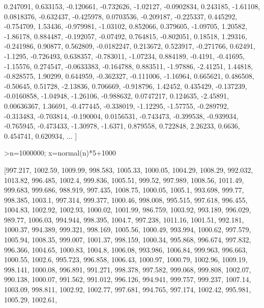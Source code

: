 \documentclass[a4paper,10pt]{article}
\begin{document}
\begin{eulernotebook}
\begin{eulercomment}
\begin{eulercomment}
\begin{euleroutput}
  0.247091,  0.633153,  -0.120661,  -0.732626,  -1.02127,  -0.0902834,
  0.243185,  -1.61108,  0.0818376,  -0.632437,  -0.425978,  0.0703536,
  -0.209187,  -0.225337,  0.445292,  -0.754709,  1.53436,  -0.979981,
  -1.03102,  0.852066,  0.379605,  -1.09705,  1.20582,  -1.86178,
  0.884487,  -0.192057,  -0.07492,  0.764815,  -0.802051,  0.18518,
  1.29316,  -0.241986,  0.90877,  0.562809,  -0.0182247,  0.213672,
  0.523917,  -0.271766,  0.62491,  -1.1295,  -0.726493,  0.638357,
  -0.783011,  -1.07234,  0.884189,  -0.4191,  -0.41695,  -1.15576,
  0.274547,  -0.0633383,  -0.164788,  0.883511,  -1.97886,  -2.41251,
  1.44818,  -0.828575,  1.90299,  0.644959,  -0.362327,  -0.111006,
  -1.16964,  0.665621,  0.486508,  -0.50645,  0.51728,  -2.13836,
  0.706669,  -0.918796,  1.42452,  0.435429,  -0.137239,  -0.0160858,
  -1.04948,  -1.26106,  -0.988632,  0.0747217,  0.124635,  -2.45891,
  0.00636367,  1.36691,  -0.477445,  -0.338019,  -1.12295,  -1.57755,
  -0.289792,  -0.313483,  -0.703814,  -0.190004,  0.0156531,  -0.743473,
  -0.399538,  -0.939934,  -0.765945,  -0.473433,  -1.30978,  -1.6371,
  0.879558,  0.722848,  2.26233,  0.6636,  0.454741,  0.620934,
   ... ]
\end{euleroutput}
\begin{eulerprompt}
>n=1000000; x=normal(n)*5+1000
\end{eulerprompt}
\begin{euleroutput}
  [997.217,  1002.59,  1009.99,  998.583,  1005.33,  1000.05,  1004.29,
  1008.29,  992.032,  1013.82,  996.485,  1002.4,  999.836,  1005.51,
  999.52,  997.989,  1008.56,  1011.49,  999.683,  999.686,  988.919,
  997.435,  1008.75,  1000.05,  1005.1,  993.698,  999.77,  998.385,
  1003.1,  997.314,  999.377,  1000.46,  998.008,  995.515,  997.618,
  996.455,  1004.83,  1002.92,  1002.93,  1000.02,  1001.99,  986.759,
  1003.92,  993.189,  996.029,  989.77,  1006.03,  994.944,  998.395,
  1004.7,  997.238,  1011.16,  1001.51,  992.181,  1000.37,  994.389,
  999.321,  998.169,  1005.56,  1000.49,  993.994,  1000.62,  997.579,
  1005.94,  1008.35,  999.007,  1001.37,  998.159,  1000.34,  995.868,
  996.674,  997.832,  996.366,  1004.65,  1000.83,  1004.8,  1006.08,
  993.986,  1006.84,  999.963,  996.663,  1000.55,  1002.6,  995.723,
  996.858,  1006.43,  1000.97,  1000.79,  1002.96,  1009.19,  998.141,
  1000.08,  996.891,  991.271,  998.378,  997.582,  999.068,  999.808,
  1002.07,  990.138,  1000.07,  991.562,  991.012,  996.126,  994.941,
  999.757,  999.237,  1007.14,  1003.09,  998.811,  1002.92,  1002.77,
  997.681,  994.765,  997.174,  1002.42,  995.981,  1005.29,  1002.61,

\end{euleroutput}
\end{eulercomment}
\end{eulercomment}
\end{eulernotebook}
\end{document}
